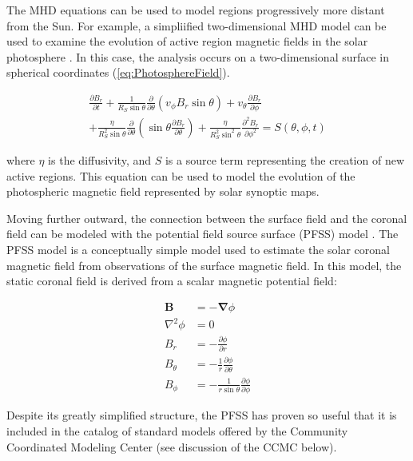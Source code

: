 \documentclass{article}
\begin{document}
The MHD equations can be used to model regions progressively more distant from the Sun. For example, a simpliified two-dimensional MHD model can be used to examine the evolution of active region magnetic fields in the solar photosphere \cite{russell2016}. In this case, the analysis occurs on a two-dimensional surface in spherical coordinates (\ref{eq:PhotosphereField}).

\begin{equation}
\begin{split}
    \frac {\partial B_r} {\partial t} + \frac {1} {R_S \sin \theta} \frac {\partial} {\partial \theta} \left( v_{\phi} B_r \sin \theta \right) + v_{\theta} \frac {\partial B_r} {\partial \phi} \\
    + \frac {\eta} {R_S^2 \sin \theta} \frac {\partial} {\partial \theta} \left( \sin \theta \frac {\partial B_r} {\partial \theta} \right) + \frac {\eta} {R_S^2 \sin^2 \theta} \frac {\partial^2 B_r} {\partial \phi^2} = S(\theta, \phi, t)
    \label{eq:PhotosphereField}
\end{split}
\end{equation}

\noindent where $\eta$ is the diffusivity, and $S$ is a source term representing the creation of new active regions. This equation can be used to model the evolution of the photospheric magnetic field represented by solar synoptic maps.

Moving further outward, the connection between the surface field and the coronal field can be modeled with the potential field source surface (PFSS) model \cite{Altschuler1969}. The PFSS model is a conceptually simple model used to estimate the solar coronal magnetic field from observations of the surface magnetic field. In this model, the static coronal field is derived from a scalar magnetic potential field:

\begin{align}
    \mathbf B &= - \mathbf \nabla \phi \\
    \nabla^2 \phi &= 0 \\
    B_r &= - \frac {\partial \phi} {\partial r} \\
    B_{\theta} &= - \frac {1} {r} \frac {\partial \phi} {\partial \theta} \\
    B_{\phi} &= - \frac {1} {r \sin \theta} \frac {\partial \phi} {\partial \phi}
    \label{eq:PFSS}
\end{align}

\noindent Despite its greatly simplified structure, the PFSS has proven so useful that it is included in the catalog of standard models offered by the Community Coordinated Modeling Center (see discussion of the CCMC below).
\end{document}
